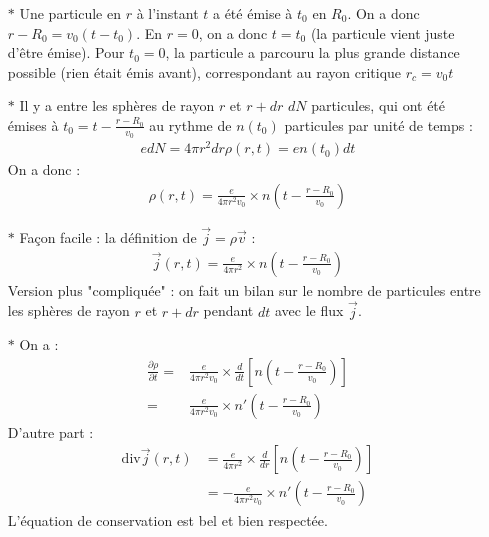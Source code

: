 \documentclass{report}
\begin{document}
\begin{itemize}

	\item[$\ast$] Une particule en $r$ à l'instant $t$ a été émise à $t_0$ en $R_0$. On a donc $r-R_0=v_0(t-t_0)$. En $r=0$, on a donc $t=t_0$ (la particule vient juste d'être émise). Pour $t_0=0$, la particule a parcouru la plus grande distance possible (rien était émis avant), correspondant au rayon critique $r_c=v_0t$
	
	\item[$\ast$] Il y a entre les sphères de rayon $r$ et $r+dr$ $dN$ particules, qui ont été émises à $t_0=t-\frac{r-R_0}{v_0}$ au rythme de $n(t_0)$ particules par unité de temps :
	\begin{align*}
		edN=4\pi r^2dr\rho(r,t)=en(t_0)dt
	\end{align*}
	On a donc :
	\begin{align*}
		\rho(r,t)=\frac{e}{4\pi r^2 v_0}\times n\left(t-\frac{r-R_0}{v_0} \right) 
	\end{align*}
	
	\item[$\ast$] Façon facile : la définition de $\vec{j}=\rho \vec{v}$ : 
	\begin{align*}
		\vec{j}(r,t)=\frac{e}{4\pi r^2}\times n\left(t-\frac{r-R_0}{v_0} \right) 
	\end{align*}
	Version plus "compliquée" : on fait un bilan sur le nombre de particules entre les sphères de rayon $r$ et $r+dr$ pendant $dt$ avec le flux $\vec{j}$.
	
	\item[$\ast$] On a :
	\begin{align*}
		\frac{\partial \rho}{\partial t}=&\frac{e}{4\pi r^2 v_0}\times \frac{d}{dt} \left[ n\left(t-\frac{r-R_0}{v_0} \right) \right] \\
		=&\frac{e}{4\pi r^2 v_0}\times n'\left(t-\frac{r-R_0}{v_0} \right)
	\end{align*}
	D'autre part : 
	\begin{align*}
		\mathrm{div}\vec{j}(r,t)&=\frac{e}{4\pi r^2}\times\frac{d}{dr} \left[ n\left(t-\frac{r-R_0}{v_0} \right) \right] \\
		&=-\frac{e}{4\pi r^2 v_0}\times n'\left(t-\frac{r-R_0}{v_0} \right)
	\end{align*}
	L'équation de conservation est bel et bien respectée.
	

\end{itemize}
\end{document}
